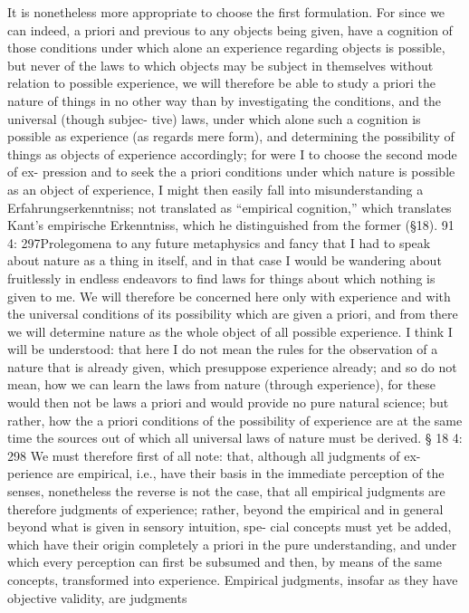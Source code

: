 It is nonetheless more appropriate to choose the ﬁrst formulation.
For since we can indeed, a priori and previous to any objects being given,
have a cognition of those conditions under which alone an experience
regarding objects is possible, but never of the laws to which objects may
be subject in themselves without relation to possible experience, we will
therefore be able to study a priori the nature of things in no other way
than by investigating the conditions, and the universal (though subjec-
tive) laws, under which alone such a cognition is possible as experience (as
regards mere form), and determining the possibility of things as objects
of experience accordingly; for were I to choose the second mode of ex-
pression and to seek the a priori conditions under which nature is possible
as an object of experience, I might then easily fall into misunderstanding
a
Erfahrungserkenntniss; not translated as “empirical cognition,” which translates Kant’s
empirische Erkenntniss, which he distinguished from the former (§18).
91
4: 297Prolegomena to any future metaphysics
and fancy that I had to speak about nature as a thing in itself, and in that
case I would be wandering about fruitlessly in endless endeavors to ﬁnd
laws for things about which nothing is given to me.
We will therefore be concerned here only with experience and with
the universal conditions of its possibility which are given a priori, and
from there we will determine nature as the whole object of all possible
experience. I think I will be understood: that here I do not mean the rules
for the observation of a nature that is already given, which presuppose
experience already; and so do not mean, how we can learn the laws from
nature (through experience), for these would then not be laws a priori
and would provide no pure natural science; but rather, how the a priori
conditions of the possibility of experience are at the same time the sources
out of which all universal laws of nature must be derived.
§ 18
4: 298
We must therefore ﬁrst of all note: that, although all judgments of ex-
perience are empirical, i.e., have their basis in the immediate perception
of the senses, nonetheless the reverse is not the case, that all empirical
judgments are therefore judgments of experience; rather, beyond the
empirical and in general beyond what is given in sensory intuition, spe-
cial concepts must yet be added, which have their origin completely a
priori in the pure understanding, and under which every perception can
ﬁrst be subsumed and then, by means of the same concepts, transformed
into experience.
Empirical judgments, insofar as they have objective validity, are judgments

